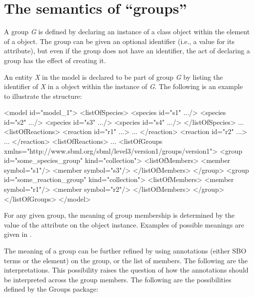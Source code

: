 \section{The semantics of ``groups''}
\label{semantics}

A group \emph{G} is defined by declaring an instance of a \Group class object within the \ListOfGroups element of a \Model object. The group can be given an optional identifier (i.e., a value for its  attribute), but even if the group does not have an identifier, the act of declaring a group has the effect of creating it.

An entity \emph{X} in the model is declared to be part of group \emph{G} by listing the identifier of \emph{X} in a \Member object within the \ListOfGroups instance of \emph{G}. The following is an example to illustrate the structure:

\begin{example}
<model id="model_1"> 
  <listOfSpecies> 
    <species id="s1" .../> 
    <species id="s2" .../> 
    <species id="s3" .../> 
    <species id="s4" .../> 
  </listOfSpecies> 
  ... 
  <listOfReactions> 
    <reaction id="r1" ...> ... </reaction> 
    <reaction id="r2" ...> ... </reaction> 
  <listOfReactions> 
  ... 
  <listOfGroups xmlns="http://www.sbml.org/sbml/level3/version1/groups/version1"> 
    <group id="some_species_group" kind="collection"> 
      <listOfMembers> 
        <member symbol="s1"/> 
        <member symbol="s3"/> 
      </listOfMembers> 
    </group> 
    <group id="some_reaction_group" kind="collection"> 
      <listOfMembers> 
        <member symbol="r1"/> 
        <member symbol="r2"/> 
      </listOfMembers> 
    </group> 
  </listOfGroups> 
</model>
\end{example}

For any given group, the meaning of group membership is determined by the value of the attribute  on the \Group object instance.  Examples of possible meanings are given in .

The meaning of a group can be further refined by using annotations (either SBO terms or the \Annotation element) on the group, or the list of members. The following are the interpretations.  This possibility raises the question of how the annotations should be interpreted across the group members.  The following are the possibilities defined by the Groups package:

